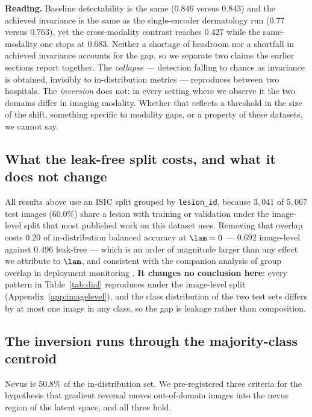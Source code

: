 \textbf{Reading.} Baseline detectability is the same ($0.846$ versus $0.843$) and the
achieved invariance is the same as the single-encoder dermatology run ($0.77$ versus
$0.763$), yet the cross-modality contrast reaches $0.427$ while the same-modality one
stops at $0.683$. Neither a shortage of headroom nor a shortfall in achieved
invariance accounts for the gap, so we separate two claims the earlier sections report
together. The \emph{collapse} --- detection falling to chance as invariance is
obtained, invisibly to in-distribution metrics --- reproduces between two hospitals.
The \emph{inversion} does not: in every setting where we observe it the two domains
differ in imaging modality. Whether that reflects a threshold in the size of the shift,
something specific to modality gaps, or a property of these datasets, we cannot say.

\subsection{What the leak-free split costs, and what it does not change}
\label{sec:lesionsplit}

All results above use an ISIC split grouped by \texttt{lesion\_id}, because
$3{,}041$ of $5{,}067$ test images ($60.0\%$) share a lesion with training or
validation under the image-level split that most published work on this dataset
uses. Removing that overlap costs $0.20$ of in-distribution balanced accuracy at
$\lam = 0$ --- $0.692$ image-level against $0.496$ leak-free --- which is an order of
magnitude larger than any effect we attribute to $\lam$, and consistent with the
companion analysis of group overlap in deployment monitoring \cite{leakagepaper}.
\textbf{It changes no conclusion here}: every pattern in Table~\ref{tab:dial}
reproduces under the image-level split (Appendix~\ref{app:imagelevel}), and the
class distribution of the two test sets differs by at most one image in any class,
so the gap is leakage rather than composition.

\subsection{The inversion runs through the majority-class centroid}
\label{sec:mechanism}

Nevus is $50.8\%$ of the in-distribution set. We pre-registered three criteria for the
hypothesis that gradient reversal moves out-of-domain images into the nevus region of
the latent space, and all three hold.

